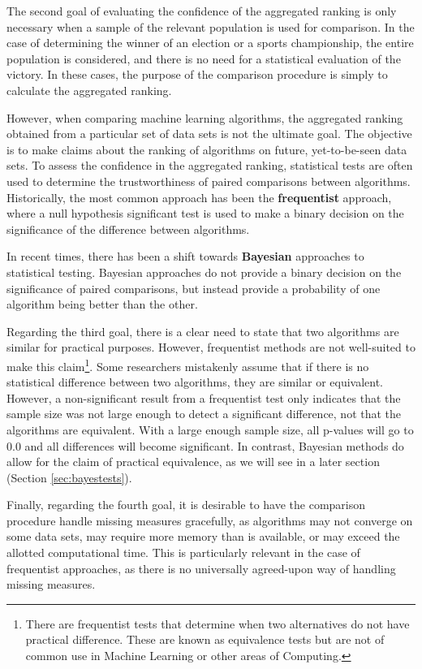 \documentclass[twoside,11pt,preprint]{article}
\begin{document}
The second goal of evaluating the confidence of the aggregated ranking is only necessary when a sample of the relevant population is used for comparison. In the case of determining the winner of an election or a sports championship, the entire population is considered, and there is no need for a statistical evaluation of the victory. In these cases, the purpose of the comparison procedure is simply to calculate the aggregated ranking.

However, when comparing machine learning algorithms, the aggregated ranking obtained from a particular set of data sets is not the ultimate goal. The objective is to make claims about the ranking of algorithms on future, yet-to-be-seen data sets.
To assess the confidence in the aggregated ranking, statistical tests are often used to determine the trustworthiness of paired comparisons between algorithms. Historically, the most common approach has been the \textbf{frequentist} approach, where a null hypothesis significant test is used to make a binary decision on the significance of the difference between algorithms.

In recent times, there has been a shift towards \textbf{Bayesian} approaches to statistical testing. Bayesian approaches do not provide a binary decision on the significance of paired comparisons, but instead provide a probability of one algorithm being better than the other.

Regarding the third goal, there is a clear need to state that two
algorithms are similar for practical purposes. However, frequentist
methods are not well-suited to make this claim\footnote{There are frequentist
  tests that determine when two alternatives do not have practical
  difference. These are known as equivalence tests \citep{eqvtest} but are
  not of common use in Machine Learning or other areas of
  Computing.}. Some researchers mistakenly assume that if there is no
statistical difference between two algorithms, they are similar or
equivalent. However, a non-significant result from a frequentist test
only indicates that the sample size was not large enough to detect a
significant difference, not that the algorithms are equivalent. With a
large enough sample size, all p-values will go to 0.0 \citep{cosma, kruschke2015bayesian} and all differences will become significant. In
contrast, Bayesian methods do allow for the claim of practical
equivalence, as we will see in a later section (Section
\ref{sec:bayestests}).

Finally, regarding the fourth goal, it is desirable to have the
comparison procedure handle missing measures gracefully, as algorithms
may not converge on some data sets, may require more memory than is
available, or may exceed the allotted computational time. This is
particularly relevant in the case of frequentist approaches, as there
is no universally agreed-upon way of handling missing measures.
\end{document}
